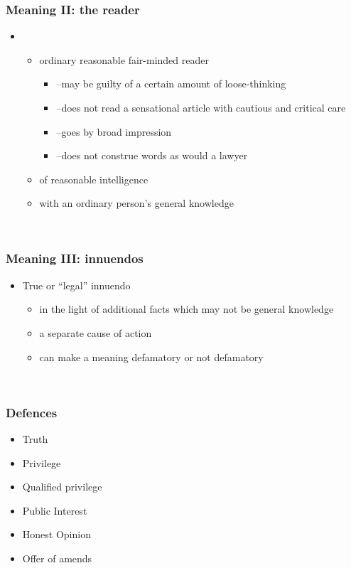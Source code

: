 \documentclass[ignorenonframetext,]{beamer}
\begin{document}
\begin{frame}
\frametitle{Meaning II: the reader}

\begin{itemize}
\item  \begin{itemize}
  \item    ordinary reasonable fair-minded reader

    \begin{itemize}
    \item      {--}may be guilty of a certain amount of loose-thinking
    \item      {--}does not read a sensational article with cautious and critical
      care
    \item      {--}goes by broad impression
    \item      {--}does not construe words as would a lawyer
    \end{itemize}
  \item    of reasonable intelligence
  \item    with an ordinary person's general knowledge
  \end{itemize}
\end{itemize}

~


\end{frame}

\begin{frame}
\frametitle{Meaning III: innuendos}

\begin{itemize}
\item  True or ``legal'' innuendo

  \begin{itemize}
  \item    in the light of additional facts which may not be general
    knowledge
  \item    a separate cause of action
  \item    can make a meaning defamatory or not defamatory
  \end{itemize}
\end{itemize}

~


\end{frame}

\begin{frame}
\frametitle{Defences}

\begin{itemize}
\item  Truth
\item  Privilege
\item  Qualified privilege
\item  Public Interest
\item  Honest Opinion
\item  Offer of amends
\end{itemize}

~


\end{frame}
\end{document}
